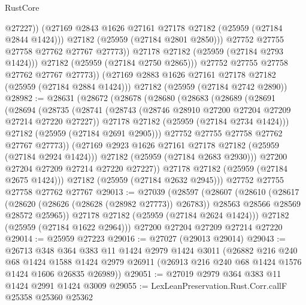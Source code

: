 \begin{lexlean}{RustCore}
\begin{coremodule}
                      @27227))
                  (@27169 @2843 @1626 @27161 @27178 @27182 (@25959 (@27184 @2844 @1424)))
                  @27182
                  (@25959 (@27184 @2801 @2850)))
                @27752
                @27755
                @27758
                @27762
                @27767
                @27773))
            @27178
            @27182
            (@25959 (@27184 @2793 @1424)))
          @27182
          (@25959 (@27184 @2750 @2865)))
        @27752
        @27755
        @27758
        @27762
        @27767
        @27773))
    (@27169 @2883 @1626 @27161 @27178 @27182 (@25959 (@27184 @2884 @1424)))
    @27182
    (@25959 (@27184 @2742 @2890))
@28982 := @28631
    (@28672
      (@28678
        (@28680
          (@28683
            (@28689
              (@28691
                (@28694
                  (@28735
                    (@28741
                      (@28743 (@28746 @28910 @27200 @27204 @27209 @27214 @27220 @27227))
                      @27178
                      @27182
                      (@25959 (@27184 @2734 @1424)))
                    @27182
                    (@25959 (@27184 @2691 @2905)))
                  @27752
                  @27755
                  @27758
                  @27762
                  @27767
                  @27773))
              (@27169 @2923 @1626 @27161 @27178 @27182 (@25959 (@27184 @2924 @1424)))
              @27182
              (@25959 (@27184 @2683 @2930)))
            @27200
            @27204
            @27209
            @27214
            @27220
            @27227))
        @27178
        @27182
        (@25959 (@27184 @2675 @1424)))
      @27182
      (@25959 (@27184 @2632 @2945)))
    @27752
    @27755
    @27758
    @27762
    @27767
@29013 := @27039
    (@28597
      (@28607
        (@28610
          (@28617
            (@28620 (@28626 (@28628 (@28982 @27773)) @26783))
            @28563
            @28566
            @28569
            @28572
            @25965))
        @27178
        @27182
        (@25959 (@27184 @2624 @1424)))
      @27182
      (@25959 (@27184 @1622 @2964)))
    @27200
    @27204
    @27209
    @27214
    @27220
@29014 := @25959 @27223
@29016 := @27027 (@29013 @29014)
@29043 := @26713
    @348
    @364
    @383
    @11
    @1424
    @2979
    @1424
    @3011
    (@26882
      @216
      @240
      @68
      @1424
      @1588
      @1424
      @2979
      @26911
      (@26913 @216 @240 @68 @1424 @1576 @1424 @1606 @26835 @26989))
@29051 := @27019 @2979 @364 @383 @11 @1424 @2991 @1424 @3009
@29055 := LexLeanPreservation.Rust.Corr.callF @25358 @25360 @25362

\end{coremodule}
\end{lexlean}
